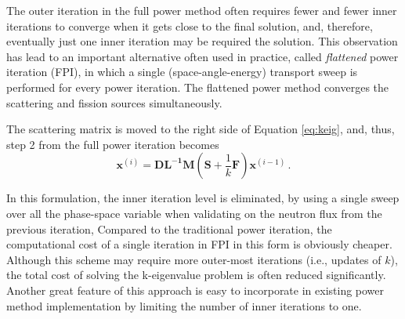 The outer iteration in the full power method often requires fewer and fewer inner iterations to converge when it gets close to the final solution, and, therefore, eventually just one inner iteration may be required the solution.  
This observation has lead to an important alternative often used in practice, called {\it flattened} power iteration (FPI), in which a single (space-angle-energy) transport sweep is performed for every power iteration.
The flattened power method converges the scattering and fission sources simultaneously.

The scattering matrix is moved to the right side of Equation \ref{eq:keig}, and, thus, step 2 from the full power iteration becomes 
\begin{equation}
 \mathbf{x}^{(i)} =  \mathbf{DL^{-1}M} (\mathbf{S} + \frac{1}{k} \mathbf{F})\mathbf{x}^{(i-1)}   \, .
 \label{eq:flatten}
\end{equation}

In this formulation, the inner iteration level is eliminated, by using a single sweep over all the phase-space variable when validating on the neutron flux from the previous iteration,  
Compared to the traditional power iteration, the computational cost of a single iteration in FPI in this form is obviously cheaper.
Although this scheme may require more outer-most iterations (i.e., updates of $k$), the total cost of solving the k-eigenvalue problem is often reduced significantly.\citep{gill_newtons_2011}
Another great feature of this approach is easy to incorporate in existing power method implementation by limiting the number of inner iterations to one. 




